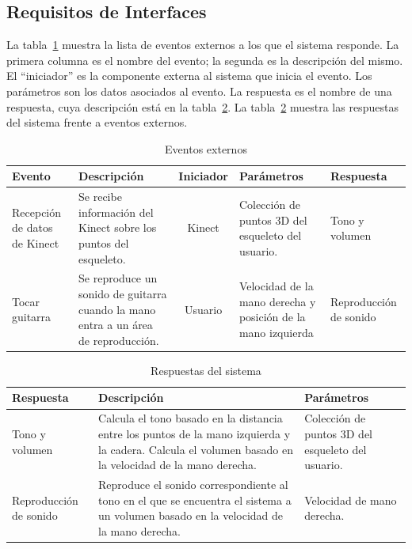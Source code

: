 \documentclass[a4paper,12pt]{article}
\begin{document}
\subsection{Requisitos de Interfaces}
La tabla~\ref{tab:event} muestra la lista de eventos externos a los que el sistema responde.
La primera columna es el nombre del evento; la segunda es la descripción del
mismo. El “iniciador” es la componente externa al sistema que inicia el evento.
Los parámetros son los datos asociados al evento. La respuesta es el nombre de
una respuesta, cuya descripción está en la tabla~\ref{tab:respuesta}.
La tabla~\ref{tab:respuesta} muestra las respuestas del sistema frente a eventos externos.
\begin{table}[h!]
        \centering
        \begin{tabular}{|p{2cm}|p{4cm}|c|p{3cm}|p{25mm}|}
                \hline
                \textbf{Evento} & \textbf{Descripción} & \textbf{Iniciador} &
                \textbf{Parámetros} & \textbf{Respuesta} \\
                \hline
                Recepción de datos de Kinect & Se recibe información del
                Kinect sobre los puntos del esqueleto. & Kinect & Colección
                de puntos 3D del esqueleto del usuario. & Tono y volumen \\
                \hline
                Tocar guitarra & Se reproduce un sonido de guitarra cuando la
                mano entra a un área de reproducción. & Usuario & Velocidad de
                la mano derecha y posición de la mano izquierda & Reproducción
                de sonido \\
                \hline
        \end{tabular}
        \caption{Eventos externos}
        \label{tab:event}
\end{table}

\begin{table}[h!]
        \centering
        \begin{tabular}{|p{3cm}|p{6cm}|p{4cm}|}
                \hline
                \textbf{Respuesta} & \textbf{Descripción} & \textbf{Parámetros} \\
                \hline
                Tono y volumen & Calcula el tono basado en la distancia entre
                los puntos de la mano izquierda y la cadera. Calcula el volumen
                basado en la velocidad de la mano derecha. & Colección de
                puntos 3D del esqueleto del usuario. \\
                \hline
                Reproducción de sonido & Reproduce el sonido correspondiente al
                tono en el que se encuentra el sistema a un volumen basado en
                la velocidad de la mano derecha. & Velocidad de mano derecha. \\
                \hline
        \end{tabular}
        \caption{Respuestas del sistema}
        \label{tab:respuesta}
\end{table}
\end{document}
